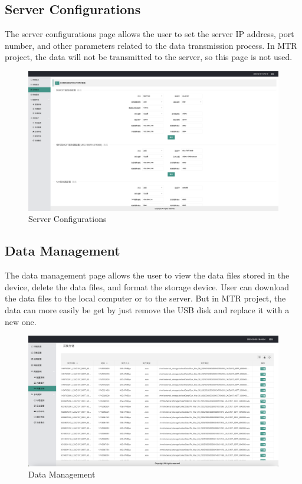 \documentclass{article}
\begin{document}
\subsection{Server Configurations}

The server configurations page allows the user to set the server IP address, port number, and other parameters related to the data transmission process. In MTR project, the data will not be transmitted to the server, so this page is not used.
\begin{figure} [H]
    \centering
    \includegraphics[width=1\textwidth]{MMI_server.png}
    \caption{Server Configurations}
\end{figure}

\subsection{Data Management}

The data management page allows the user to view the data files stored in the device, delete the data files, and format the storage device. User can download the data files to the local computer or to the server. But in MTR project, the data can more easily be get by just remove the USB disk and replace it with a new one.
\begin{figure} [H]
    \centering
    \includegraphics[width=1\textwidth]{MMI_storage_ex.png}
    \caption{Data Management}
\end{figure}
\end{document}
